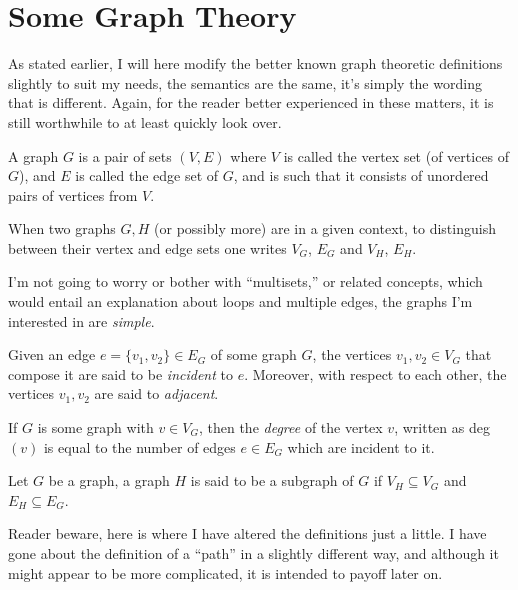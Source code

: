 \documentclass[twoside]{book}
\newenvironment{definition}[1][Definition]{\begin{trivlist}
\item[\hskip \labelsep {\bfseries Definition (#1):}]}{\end{trivlist}}
\begin{document}
\chapter{Some Graph Theory}

As stated earlier, I will here modify the better known graph theoretic definitions slightly to suit my needs,
the semantics are the same, it's simply the wording that is different.  Again, for the reader better experienced
in these matters, it is still worthwhile to at least quickly look over.

\begin{definition}[Graph]

A graph $ G $ is a pair of sets $ (V, E) $ where $ V $ is called the vertex set (of vertices of $ G $), and $ E $ is
called the edge set of $ G $, and is such that it consists of unordered pairs of vertices from $ V $.

\end{definition}
When two graphs $ G, H $ (or possibly more) are in a given context, to distinguish between their vertex and edge sets one
writes $ V_G $, $ E_G $ and $ V_H $, $ E_H $.

I'm not going to worry or bother with ``multisets,'' or related concepts, which would entail an explanation about loops
and multiple edges, the graphs I'm interested in are \emph{simple}.

Given an edge $ e=\{v_1, v_2\}\in E_G $ of some graph $ G $, the vertices $ v_1, v_2\in V_G $ that compose it are said to
be \emph{incident} to $ e $.  Moreover, with respect to each other, the vertices $ v_1, v_2 $ are said to \emph{adjacent}.

If $ G $ is some graph with $ v\in V_G $, then the \emph{degree} of the vertex $ v $, written as deg$ (v) $ is
equal to the number of edges $ e\in E_G $ which are incident to it.

\begin{definition}[Subgraph]

Let $ G $ be a graph, a graph $ H $ is said to be a subgraph of $ G $ if $ V_H\subseteq V_G $ and $ E_H\subseteq E_G $.

\end{definition}

Reader beware, here is where I have altered the definitions just a little.  I have gone about the definition of
a ``path'' in a slightly different way, and although it might appear to be more complicated, it is intended to
payoff later on. 
\end{document}

